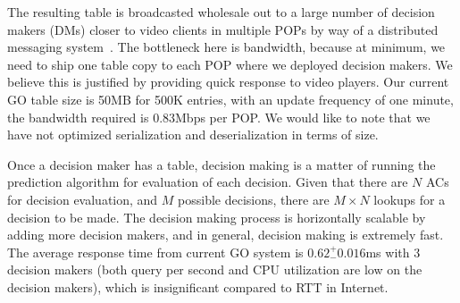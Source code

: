 
 The resulting table is broadcasted wholesale out to a large number of decision makers (DMs) closer to video clients in multiple POPs by way of a distributed messaging system~\cite{kafka}. The bottleneck here is bandwidth, because at minimum, we need to ship one table copy to each POP where we deployed decision makers. We believe this is justified by providing quick response to video players. Our current GO table size is 50MB for 500K entries, with an update frequency of one minute, the bandwidth required is 0.83Mbps per POP. We would like to note that we have not optimized serialization and deserialization in terms of size.


 Once a decision maker has a table, decision making is a matter of running the prediction algorithm for evaluation of each decision. Given that there are $N$ ACs for decision evaluation, and $M$ possible decisions, there are $M \times N$ lookups for a decision to be made. The decision making process is horizontally scalable by adding more decision makers, and in general, decision making is extremely fast. The average response time from current GO system is $0.62 ^{+}_{-} 0.016$ms with 3 decision makers (both query per second and CPU utilization are low on the decision makers), which is insignificant compared to RTT in Internet.

